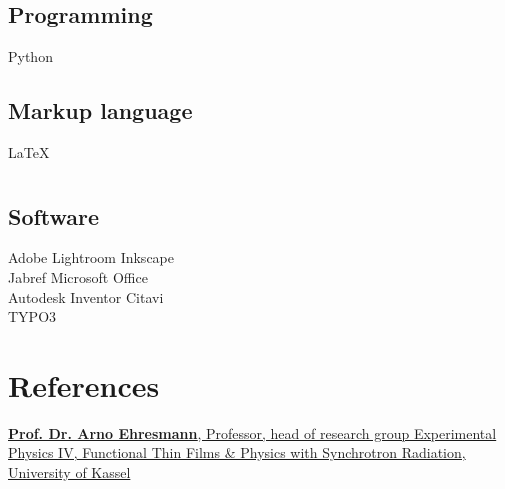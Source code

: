 \begin{adjustwidth}{2.5cm}{1.9cm}
\begin{minipage}[t]{0.25\textwidth}
\section{}
\subsection{Programming}
{}
Python
\sectionsep
\subsection{Markup language}
\LaTeX
\end{minipage}
\begin{minipage}[t]{0.25\textwidth}
\section{}
\subsection{Software}
{}
Adobe Lightroom \textbullet{}  Inkscape  \\
\noindent
Jabref \textbullet{}   Microsoft Office \\
{}
Autodesk Inventor \textbullet{}  Citavi\\
TYPO3\\
\end{minipage}
\sectionsep
\vspace{2mm}
\section{References} 
\href{http://ag-ehresmann.de/}{\textbf{Prof. Dr. Arno Ehresmann}, Professor, head of research group Experimental Physics IV, Functional Thin Films \& Physics with Synchrotron Radiation, University of Kassel}



\end{adjustwidth}

